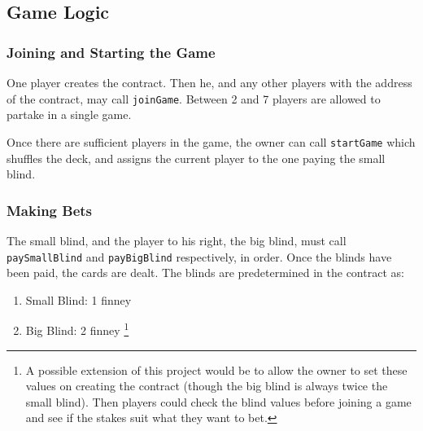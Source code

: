 %
%
%

\subsection{Game Logic}

\subsubsection{Joining and Starting the Game}

One player creates the contract. Then he, and any other players with the address of the contract, may call \texttt{joinGame}. Between 2 and 7 players are allowed to partake in a single game.

Once there are sufficient players in the game, the owner can call \texttt{startGame} which shuffles the deck, and assigns the current player to the one paying the small blind.

\subsubsection{Making Bets}

The small blind, and the player to his right, the big blind, must call \texttt{paySmallBlind} and \texttt{payBigBlind} respectively, in order. Once the blinds have been paid, the cards are dealt. The blinds are predetermined in the contract as:

\begin{enumerate}[$\bullet$]
\item Small Blind: 1 finney
\item Big Blind: 2 finney \footnote{A possible extension of this project would be to allow the owner to set these values on creating the contract (though the big blind is always twice the small blind). Then players could check the blind values before joining a game and see if the stakes suit what they want to bet.}
\end{enumerate}

